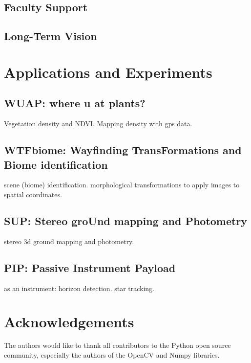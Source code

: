 \documentclass[conference]{IEEEtran} %
\begin{document}
\subsection{Faculty Support}


\subsection{Long-Term Vision}
\label{sec:vision}


\section{Applications and Experiments}
\label{sec:payloads}
\subsection{WUAP: where u at plants?}
Vegetation density and NDVI. Mapping density with gps data.

\subsection{WTFbiome: Wayfinding TransFormations and Biome identification}
scene (biome) identification.
morphological transformations to apply images to spatial coordinates.

\subsection{SUP: Stereo groUnd mapping and Photometry}
stereo 3d ground mapping and photometry.

\subsection{PIP: Passive Instrument Payload}
as an instrument: horizon detection. star tracking.

\section*{Acknowledgements}
The authors would like to thank all contributors to the Python open source community, especially the authors of the OpenCV and Numpy libraries.




\onecolumn
\appendices{}
\end{document}
